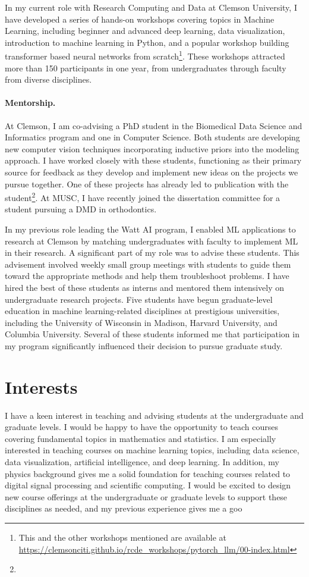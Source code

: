 \documentclass[nobib]{tufte-handout}
\begin{document}
In my current role with Research Computing and Data at Clemson University, I have developed a series of hands-on workshops covering topics in Machine Learning, including beginner and advanced deep learning, data visualization, introduction to machine learning in Python, and a popular workshop building transformer based neural networks from scratch\thanks{This and the other workshops mentioned are available at \url{https://clemsonciti.github.io/rcde_workshops/pytorch_llm/00-index.html}}. These workshops attracted more than 150 participants in one year, from undergraduates through faculty from diverse disciplines.

\paragraph{Mentorship.} At Clemson, I am co-advising a PhD student in the Biomedical Data Science and Informatics program and one in Computer Science. Both students are developing new computer vision techniques incorporating inductive priors into the modeling approach. I have worked closely with these students, functioning as their primary source for feedback as they develop and implement new ideas on the projects we pursue together. One of these projects has already led to publication with the student\thanks{}. At MUSC, I have recently joined the dissertation committee for a student pursuing a DMD in orthodontics.

In my previous role leading the Watt AI program, I enabled ML applications to research at Clemson by matching undergraduates with faculty to implement ML in their research. A significant part of my role was to advise these students. This advisement involved weekly small group meetings with students to guide them toward the appropriate methods and help them troubleshoot problems. I have hired the best of these students as interns and mentored them intensively on undergraduate research projects. Five students have begun graduate-level education in machine learning-related disciplines at prestigious universities, including the University of Wisconsin in Madison, Harvard University, and Columbia University. Several of these students informed me that participation in my program significantly influenced their decision to pursue graduate study.

\section{Interests}
I have a keen interest in teaching and advising students at the undergraduate and graduate levels. I would be happy to have the opportunity to teach courses covering fundamental topics in mathematics and statistics. I am especially interested in teaching courses on machine learning topics, including data science, data visualization, artificial intelligence, and deep learning. In addition, my physics background gives me a solid foundation for teaching courses related to digital signal processing and scientific computing. I would be excited to design new course offerings at the undergraduate or graduate levels to support these disciplines as needed, and my previous experience gives me a goo
\end{document}
